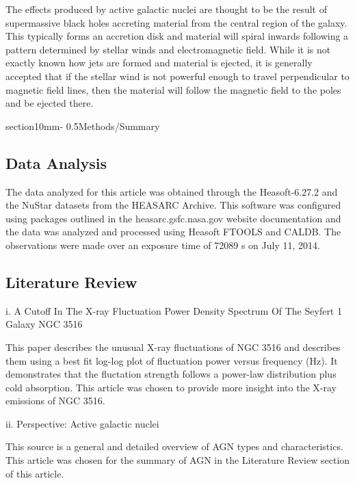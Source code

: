 \documentclass[letterpaper,11pt,twocolumn]{article}
\makeatletter
\renewcommand{\section}{\@startsection%
{section}{1}{0mm}{-\baselineskip}%
{0.5\baselineskip}{\normalfont\Large\bfseries}}%
\makeatother
\begin{document}
The effects produced by active galactic nuclei are thought to be the result of supermassive black holes accreting material from the central region of the galaxy. This typically forms an accretion disk and material will spiral inwards following a pattern determined by stellar winds and electromagnetic field. While it is not exactly known how jets are formed and material is ejected, it is generally accepted that if the stellar wind is not powerful enough to travel perpendicular to magnetic field lines, then the material will follow the magnetic field to the poles and be ejected there.


\section{Methods/Summary}

\subsection{Data Analysis}

The data analyzed for this article was obtained through the Heasoft-6.27.2 and the NuStar datasets from the HEASARC Archive. This software was configured using packages outlined in the heasarc.gsfc.nasa.gov website documentation and the data was analyzed and processed using Heasoft FTOOLS and CALDB. The observations were made over an exposure time of 72089 s on July 11, 2014.

\subsection{Literature Review}

i. A Cutoff In The X-ray Fluctuation Power Density Spectrum Of The Seyfert 1 Galaxy NGC 3516

This paper describes the unusual X-ray fluctuations of NGC 3516 and describes them using a best fit log-log plot of fluctuation power versus frequency (Hz). It demonstrates that the fluctation strength follows a power-law distribution plus cold absorption. This article was chosen to provide more insight into the X-ray emissions of NGC 3516.

ii. Perspective: Active galactic nuclei

This source is a general and detailed overview of AGN types and characteristics. This article was chosen for the summary of AGN in the Literature Review section of this article.
\end{document}
